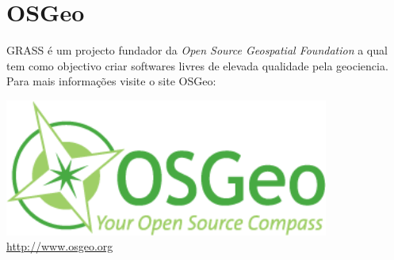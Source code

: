 \documentclass[notumble,a4paper,10pt,nofoldmark]{leaflet}
\begin{document}
\vfill
\section{OSGeo}

GRASS \'{e} um projecto fundador da {\it Open Source Geospatial Foundation} a qual tem como objectivo criar softwares livres de elevada qualidade pela geociencia. Para mais informa\c{c}\~{o}es visite o site OSGeo:
\begin{center}
\includegraphics[width=0.8\textwidth]{OSGeo_logo}\\
\url{http://www.osgeo.org}
\end{center}
\end{document}
